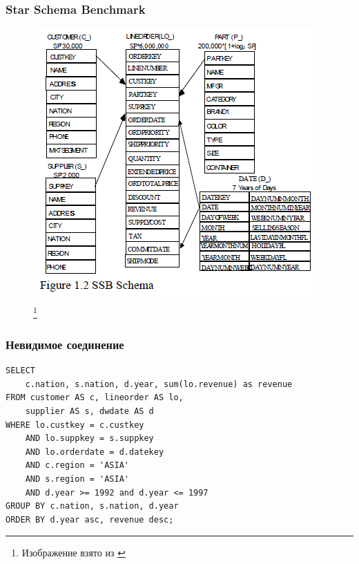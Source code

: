 \documentclass{beamer}
\begin{document}
\begin{frame}
\frametitle{Star Schema Benchmark}

\begin{figure}[htb]
\includegraphics[width=\textwidth,height=0.750\textheight,keepaspectratio]{ssb.png} 
\footnote{\tiny{Изображение взято из \cite{SSB}}}
\end{figure}   

\end{frame}





\begin{frame}[fragile]
\frametitle{Невидимое соединение}

\lstset{language=SQL}

\begin{lstlisting}
SELECT 
    c.nation, s.nation, d.year, sum(lo.revenue) as revenue
FROM customer AS c, lineorder AS lo,
    supplier AS s, dwdate AS d
WHERE lo.custkey = c.custkey
    AND lo.suppkey = s.suppkey
    AND lo.orderdate = d.datekey
    AND c.region = 'ASIA'
    AND s.region = 'ASIA'
    AND d.year >= 1992 and d.year <= 1997
GROUP BY c.nation, s.nation, d.year
ORDER BY d.year asc, revenue desc;
\end{lstlisting}

\end{frame}
\end{document}
